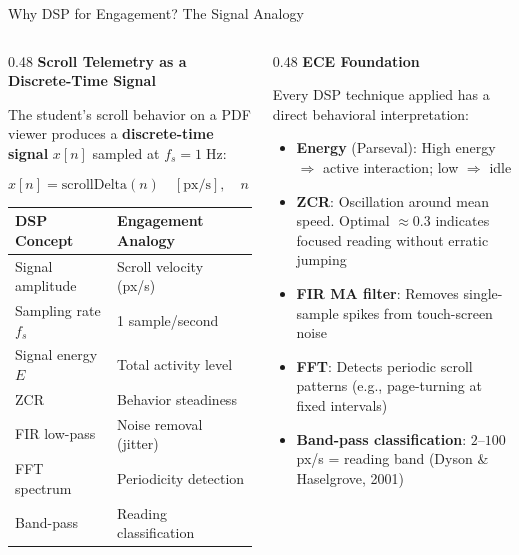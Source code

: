\documentclass[aspectratio=169,10pt]{beamer}
\begin{document}
\begin{frame}{Why DSP for Engagement? The Signal Analogy}
\begin{columns}[T]
\begin{column}{0.48\textwidth}
\textbf{Scroll Telemetry as a Discrete-Time Signal}

\vspace{4pt}
\footnotesize
The student's scroll behavior on a PDF viewer produces a \textbf{discrete-time signal} $x[n]$ sampled at $f_s = 1\;\text{Hz}$:

\vspace{4pt}
\begin{equation*}
x[n] = \text{scrollDelta}(n) \quad [\text{px/s}], \quad n = 0, 1, \ldots, N{-}1
\end{equation*}

\vspace{4pt}
\begin{tabular}{@{}ll@{}}
\toprule
\textbf{DSP Concept} & \textbf{Engagement Analogy} \\
\midrule
Signal amplitude & Scroll velocity (px/s) \\
Sampling rate $f_s$ & 1 sample/second \\
Signal energy $E$ & Total activity level \\
ZCR & Behavior steadiness \\
FIR low-pass & Noise removal (jitter) \\
FFT spectrum & Periodicity detection \\
Band-pass & Reading classification \\
\bottomrule
\end{tabular}
\end{column}

\begin{column}{0.48\textwidth}
\textbf{ECE Foundation}

\vspace{4pt}
\footnotesize
Every DSP technique applied has a direct behavioral interpretation:

\begin{itemize}\scriptsize
  \item \textbf{Energy} (Parseval): High energy $\Rightarrow$ active interaction; low $\Rightarrow$ idle
  \item \textbf{ZCR}: Oscillation around mean speed. Optimal $\approx 0.3$ indicates focused reading without erratic jumping
  \item \textbf{FIR MA filter}: Removes single-sample spikes from touch-screen noise
  \item \textbf{FFT}: Detects periodic scroll patterns (e.g., page-turning at fixed intervals)
  \item \textbf{Band-pass classification}: $2\text{--}100$ px/s = reading band (Dyson \& Haselgrove, 2001)
\end{itemize}


\end{column}
\end{columns}
\end{frame}
\end{document}
